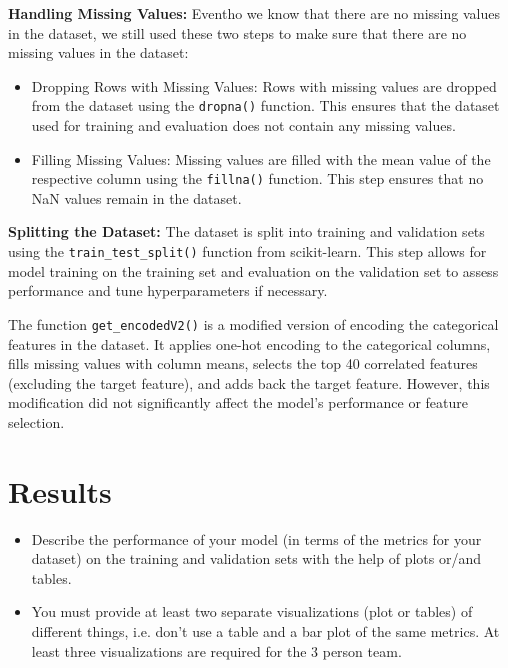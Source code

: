 \documentclass[a4, 10 pt, conference]{ieeeconf}  %
\begin{document}
\textbf{Handling Missing Values:} Eventho we know that there are no missing values in the dataset, we still used these two steps to make sure that there are no missing values in the dataset:
\begin{itemize}
  \item Dropping Rows with Missing Values: Rows with missing values are dropped from the dataset using the \texttt{dropna()} function. This ensures that the dataset used for training and evaluation does not contain any missing values.
  \item Filling Missing Values: Missing values are filled with the mean value of the respective column using the \texttt{fillna()} function. This step ensures that no NaN values remain in the dataset.
\end{itemize}

\textbf{Splitting the Dataset:} The dataset is split into training and validation sets using the \texttt{train\_test\_split()} function from scikit-learn. This step allows for model training on the training set and evaluation on the validation set to assess performance and tune hyperparameters if necessary.

The function \texttt{get\_encodedV2()} is a modified version of encoding the categorical features in the dataset. It applies one-hot encoding to the categorical columns, fills missing values with column means, selects the top 40 correlated features (excluding the target feature), and adds back the target feature. However, this modification did not significantly affect the model's performance or feature selection.

\section{Results}
\label{sec:results}

{\color{blue}

  \begin{itemize}
    \item Describe the performance of your model (in terms of the metrics for your dataset) on the training and validation sets with the help of plots or/and tables.
    \item You must provide at least two separate visualizations
          (plot or tables) of different things, i.e. don’t use a table
          and a bar plot of the same metrics. At least three
          visualizations are required for the 3 person team.
  \end{itemize}
}
\end{document}
